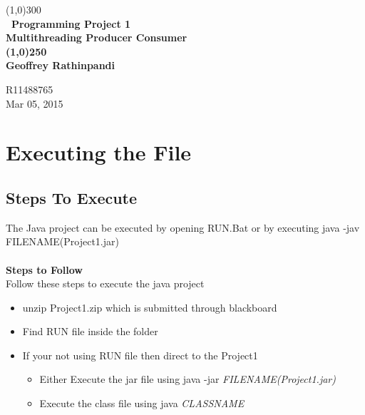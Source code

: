 \documentclass{article}
\begin{document}
\begin{titlepage}
	\begin{center}
	\line(1,0){300}\\
	[0.25in]
	\huge\bfseries\ Programming Project 1\\ Multithreading  Producer Consumer \\
	
	
	\line(1,0){250}\\
	\bfseries {Geoffrey Rathinpandi}\\
	\end{center}
	
	

	\begin{flushright}
	\textsc{R11488765}\\
	Mar 05, 2015
	
	\end{flushright}
	\tableofcontents
\end{titlepage}
\section{Executing the File}
\subsection{Steps To Execute}
The Java project can be executed by opening  RUN.Bat or by executing java -jav FILENAME(Project1.jar)
\\ \\
\textbf{Steps to Follow}
\\
Follow these steps to execute the java project 
\begin{itemize}
\item unzip  Project1.zip which is submitted through blackboard
\item Find RUN file inside the  folder
\item If your not using RUN file  then direct to the Project1 
\begin{itemize}
\item  Either Execute the jar file using java -jar \textit{FILENAME(Project1.jar)} 
\item   Execute the class file using java \textit{CLASSNAME}
\end{itemize} 

\end{itemize}
\end{document}
